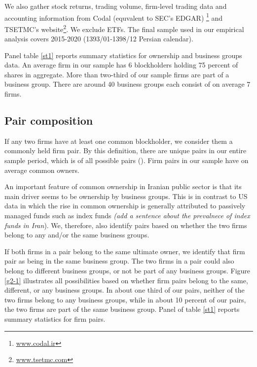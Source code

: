 	We also gather stock returns, trading volume, firm-level trading data and accounting information from Codal (equvalent to SEC's EDGAR) \footnote{\href{http://www.codal.ir}{www.codal.ir}}
and TSETMC's website\footnote{\href{http://www.tsetmc.com}{www.tsetmc.com}}. We exclude ETFs. The final sample used in our empirical analysis covers 2015-2020 (1393/01-1398/12 Persian calendar). 



Panel  table \ref{st1} reports summary statistics for ownership and business groups data. An average firm in our sample has 6 blockholders holding 75 percent of shares in aggregate. More than two-third of our sample firms are part of a business group. There are around 40 business groups each consist of on average 7 firms.






\subsection{{Pair composition} }

	If any two firms have at least one common blockholder, we consider them a commonly held firm pair. By this definition, there are   unique pairs in our entire sample period, which is of all possible pairs (). Firm pairs in our sample have on average common owners. 
	
	
	\normalcolor
	
	An important feature of common ownership in Iranian public sector is that its main driver seems to be ownership by business groups. This is in contrast to US data in which the rise in common ownership is generally attributed to passively managed funds such as index funds \textit{(add a sentence about the prevalnece of index funds in Iran}). We, therefore, also identify pairs based on whether the two firms belong to any and/or the same business groups. 
	
	If both firms in a pair belong to the same ultimate owner, we identify that firm pair as being in the same business group. The two firms in a pair could also belong to different business groups, or not be part of any business groups. Figure \ref{g2-1} illustrates all possibilities based on whether firm pairs belong to the same, different, or any business groups. In about one third of our pairs, neither of the two firms belong to any business groups, while in about 10 percent of our pairs, the two firms are part of the same business group. Panel  of table \ref{st1} reports summary statistics for firm pairs.
	
